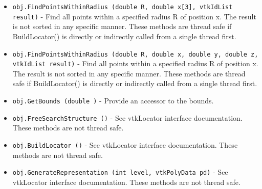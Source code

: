 \begin{itemize}
\item  \verb|obj.FindPointsWithinRadius (double R, double x[3], vtkIdList result)| -  Find all points within a specified radius R of position x.
 The result is not sorted in any specific manner.
 These methods are thread safe if BuildLocator() is directly or
 indirectly called from a single thread first.

\item  \verb|obj.FindPointsWithinRadius (double R, double x, double y, double z, vtkIdList result)| -  Find all points within a specified radius R of position x.
 The result is not sorted in any specific manner.
 These methods are thread safe if BuildLocator() is directly or
 indirectly called from a single thread first.

\item  \verb|obj.GetBounds (double )| -  Provide an accessor to the bounds.

\item  \verb|obj.FreeSearchStructure ()| -  See vtkLocator interface documentation.
 These methods are not thread safe.

\item  \verb|obj.BuildLocator ()| -  See vtkLocator interface documentation.
 These methods are not thread safe.

\item  \verb|obj.GenerateRepresentation (int level, vtkPolyData pd)| -  See vtkLocator interface documentation.
 These methods are not thread safe.

\end{itemize}
